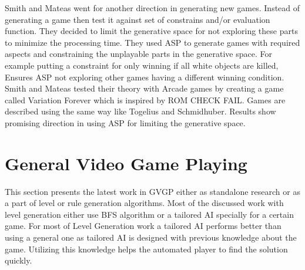 Smith and Mateas\cite{variationForever} went for another direction in generating new games. Instead of generating a game then test it against set of constrains and/or evaluation function. They decided to limit the generative space for not exploring these parts to minimize the processing time. They used ASP to generate games with required aspects and constraining the unplayable parts in the generative space. For example putting a constraint for only winning if all white objects are killed, Ensures ASP not exploring other games having a different winning condition. Smith and Mateas tested their theory with Arcade games by creating a game called Variation Forever\cite{variationForeverGame} which is inspired by ROM CHECK FAIL\cite{romCheckFail}. Games are described using the same way like Togelius and Schmidhuber\cite{arcadeHillClimber}. Results show promising direction in using ASP for limiting the generative space.

\section{General Video Game Playing}
This section presents the latest work in GVGP either as standalone research or as a part of level or rule generation algorithms. Most of the discussed work with level generation either use BFS algorithm\cite{sokobanLevelGenerationOld} or a tailored AI specially for a certain game\cite{ctrSimulationApproach}. For most of Level Generation work a tailored AI performs better than using a general one as tailored AI is designed with previous knowledge about the game. Utilizing this knowledge helps the automated player to find the solution quickly.\\\par

